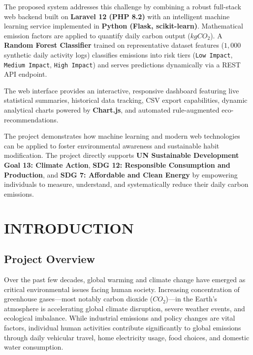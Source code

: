 \documentclass[12pt,a4paper]{report}
\begin{document}
The proposed system addresses this challenge by combining a robust full-stack web backend built on \textbf{Laravel 12 (PHP 8.2)} with an intelligent machine learning service implemented in \textbf{Python (Flask, scikit-learn)}. Mathematical emission factors are applied to quantify daily carbon output ($kg CO_2$). A \textbf{Random Forest Classifier} trained on representative dataset features ($1,000$ synthetic daily activity logs) classifies emissions into risk tiers (\texttt{Low Impact}, \texttt{Medium Impact}, \texttt{High Impact}) and serves predictions dynamically via a REST API endpoint.

The web interface provides an interactive, responsive dashboard featuring live statistical summaries, historical data tracking, CSV export capabilities, dynamic analytical charts powered by \textbf{Chart.js}, and automated rule-augmented eco-recommendations.

The project demonstrates how machine learning and modern web technologies can be applied to foster environmental awareness and sustainable habit modification. The project directly supports \textbf{UN Sustainable Development Goal 13: Climate Action}, \textbf{SDG 12: Responsible Consumption and Production}, and \textbf{SDG 7: Affordable and Clean Energy} by empowering individuals to measure, understand, and systematically reduce their daily carbon emissions.

\clearpage
\tableofcontents

\clearpage
\listoffigures
{}

\clearpage
\listoftables
{}

\clearpage
{}
\setcounter{page}{1}

\chapter{INTRODUCTION}

\section{Project Overview}
Over the past few decades, global warming and climate change have emerged as critical environmental issues facing human society. Increasing concentration of greenhouse gases---most notably carbon dioxide ($CO_2$)---in the Earth's atmosphere is accelerating global climate disruption, severe weather events, and ecological imbalance. While industrial emissions and policy changes are vital factors, individual human activities contribute significantly to global emissions through daily vehicular travel, home electricity usage, food choices, and domestic water consumption.
\end{document}
